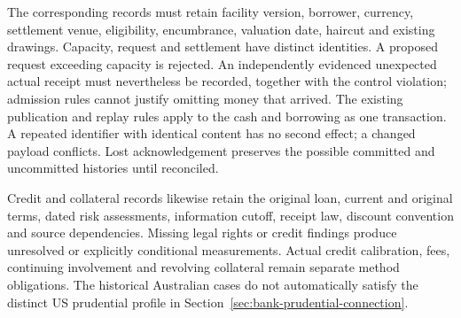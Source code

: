 The corresponding records must retain facility version, borrower, currency,
settlement venue, eligibility, encumbrance, valuation date, haircut and
existing drawings. Capacity, request and settlement have distinct identities.
A proposed request exceeding capacity is rejected. An independently evidenced
unexpected actual receipt must nevertheless be recorded, together with the
control violation; admission rules cannot justify omitting money that arrived.
The existing publication and replay rules apply to the cash and borrowing
as one transaction. A repeated identifier with identical content has no
second effect; a changed payload conflicts. Lost acknowledgement preserves
the possible committed and uncommitted histories until reconciled.

Credit and collateral records likewise retain the original loan, current and
original terms, dated risk assessments, information cutoff, receipt law,
discount convention and source dependencies. Missing legal rights or credit
findings produce unresolved or explicitly conditional measurements. Actual
credit calibration, fees, continuing involvement and revolving collateral
remain separate method obligations. The historical Australian cases do not
automatically satisfy the distinct US prudential profile in
Section~\ref{sec:bank-prudential-connection}.
